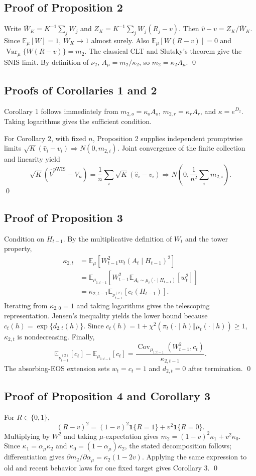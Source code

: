 \documentclass[10pt]{article}
\theoremstyle{remark}
\newcommand{\E}{\mathbb{E}}
\newcommand{\Var}{\operatorname{Var}}
\newcommand{\Cov}{\operatorname{Cov}}
\newcommand{\pWIS}{\mathrm{pWIS}}
\newcommand{\ind}{\mathbf{1}}
\begin{document}
\subsection{Proof of Proposition 2}
Write $\overline W_K=K^{-1}\sum_jW_j$ and $Z_K=K^{-1}\sum_jW_j(R_j-v)$. Then $\widehat v-v=Z_K/\overline W_K$. Since $\E_\mu[W]=1$, $\overline W_K\to1$ almost surely. Also $\E_\mu[W(R-v)]=0$ and $\Var_\mu\{W(R-v)\}=m_2$. The classical CLT and Slutsky's theorem give the SNIS limit. By definition of $\nu_2$, $A_\mu=m_2/\kappa_2$, so $m_2=\kappa_2A_\mu$. \qed

\subsection{Proofs of Corollaries 1 and 2}
Corollary 1 follows immediately from $m_{2,o}=\kappa_oA_o$, $m_{2,r}=\kappa_rA_r$, and $\kappa=e^{D_2}$. Taking logarithms gives the sufficient condition.

For Corollary 2, with fixed $n$, Proposition 2 supplies independent promptwise limits $\sqrt K(\widehat v_i-v_i)\Rightarrow N(0,m_{2,i})$. Joint convergence of the finite collection and linearity yield
\[
\sqrt K(\widehat V^{\pWIS}-V_n)=\frac1n\sum_i\sqrt K(\widehat v_i-v_i)
\Rightarrow N\!\left(0,\frac1{n^2}\sum_i m_{2,i}\right).
\]
\qed

\subsection{Proof of Proposition 3}
Condition on $H_{t-1}$. By the multiplicative definition of $W_t$ and the tower property,
\begin{align*}
\kappa_{2,t}
&=\E_\mu[W_{t-1}^2w_t(A_t\mid H_{t-1})^2]\\
&=\E_{\mu_{1:t-1}}\!\left[W_{t-1}^2\E_{A_t\sim\mu_t(\cdot\mid H_{t-1})}[w_t^2]\right]\\
&=\kappa_{2,t-1}\E_{\nu_{t-1}^{(2)}}[c_t(H_{t-1})].
\end{align*}
Iterating from $\kappa_{2,0}=1$ and taking logarithms gives the telescoping representation. Jensen's inequality yields the lower bound because $c_t(h)=\exp\{d_{2,t}(h)\}$. Since $c_t(h)=1+\chi^2(\pi_t(\cdot\mid h)\Vert\mu_t(\cdot\mid h))\ge1$, $\kappa_{2,t}$ is nondecreasing. Finally,
\[
\E_{\nu_{t-1}^{(2)}}[c_t]-\E_{\mu_{1:t-1}}[c_t]
=\frac{\Cov_{\mu_{1:t-1}}(W_{t-1}^2,c_t)}{\kappa_{2,t-1}}.
\]
The absorbing-EOS extension sets $w_t=c_t=1$ and $d_{2,t}=0$ after termination. \qed

\subsection{Proof of Proposition 4 and Corollary 3}
For $R\in\{0,1\}$,
\[
(R-v)^2=(1-v)^2\ind\{R=1\}+v^2\ind\{R=0\}.
\]
Multiplying by $W^2$ and taking $\mu$-expectation gives $m_2=(1-v)^2\kappa_1+v^2\kappa_0$. Since $\kappa_1=\alpha_\mu\kappa_2$ and $\kappa_0=(1-\alpha_\mu)\kappa_2$, the stated decomposition follows; differentiation gives $\partial m_2/\partial\alpha_\mu=\kappa_2(1-2v)$. Applying the same expression to old and recent behavior laws for one fixed target gives Corollary 3. \qed
\end{document}
